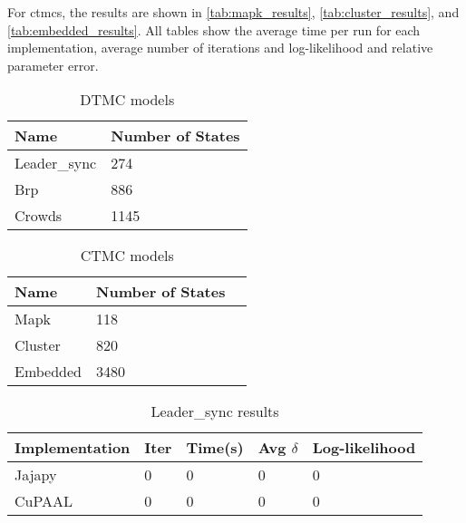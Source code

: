 For \glspl{ctmc}, the results are shown in \autoref{tab:mapk_results}, \autoref{tab:cluster_results}, and \autoref{tab:embedded_results}.
All tables show the average time per run for each implementation, average number of iterations and log-likelihood and relative parameter error.

\begin{table}[!htb]
    \centering
    \caption{DTMC models}
    \label{tab:dtmc_models}
    \begin{tabular}{ll}
        \toprule
        Name         & Number of States \\
        \midrule
        Leader\_sync & 274              \\
        Brp          & 886              \\
        Crowds       & 1145             \\
        \bottomrule
    \end{tabular}
\end{table}

\begin{table}[!htb]
    \centering
    \caption{CTMC models}
    \label{tab:ctmc_models}
    \begin{tabular}{lll}
        \toprule
        Name     & Number of States \\
        \midrule
        Mapk     & 118              \\
        Cluster  & 820              \\
        Embedded & 3480             \\
        \bottomrule
    \end{tabular}
\end{table}


\begin{table}[!htb]
    \centering
    \caption{Leader\_sync results}
    \label{tab:leader_results}
    \begin{tabular}{lllll}
        \toprule
        Implementation & Iter & Time(s) & Avg $\delta$ & Log-likelihood \\
        \midrule
        Jajapy         & 0    & 0       & 0            & 0              \\
        CuPAAL         & 0    & 0       & 0            & 0              \\
        \bottomrule
    \end{tabular}
\end{table}


